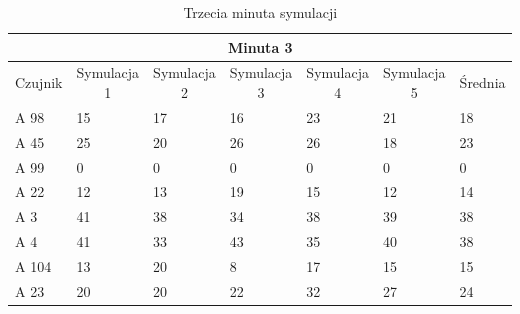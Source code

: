 \documentclass[a4paper,12pt]{article}
\begin{document}
\newpage
\begin{table}[!h]
	\centering

\begin{tabular}{|l|l|l|l|l|l|l|}
\hline
\multicolumn{7}{|c|}{Minuta 3}                                                                                                                                                                                                                   \\ \hline
\multicolumn{1}{|c|}{Czujnik} & \multicolumn{1}{c|}{Symulacja 1} & \multicolumn{1}{c|}{Symulacja 2} & \multicolumn{1}{c|}{Symulacja 3} & \multicolumn{1}{c|}{Symulacja 4} & \multicolumn{1}{c|}{Symulacja 5} & \multicolumn{1}{c|}{Średnia} \\ \hline
A 98                          & 15                               & 17                               & 16                              & 23                             & 21                             & 18                                     \\ \hline
A 45                          & 25                               & 20                               & 26                              & 26                             & 18                             & 23                                     \\ \hline
A 99                          & 0                                & 0                                & 0                               & 0                              & 0                              & 0                                      \\ \hline
A 22                          & 12                               & 13                               & 19                              & 15                             & 12                             & 14                                     \\ \hline
A 3                           & 41                               & 38                               & 34                              & 38                             & 39                             & 38                                     \\ \hline
A 4                           & 41                               & 33                               & 43                              & 35                             & 40                             & 38                                     \\ \hline
A 104                         & 13                               & 20                               & 8                               & 17                             & 15                             & 15                                     \\ \hline
A 23                          & 20                               & 20                               & 22                              & 32                             & 27                             & 24                                     \\ \hline
\end{tabular}
\caption{Trzecia minuta symulacji}
\label{tab:3}
\end{table}
\end{document}

